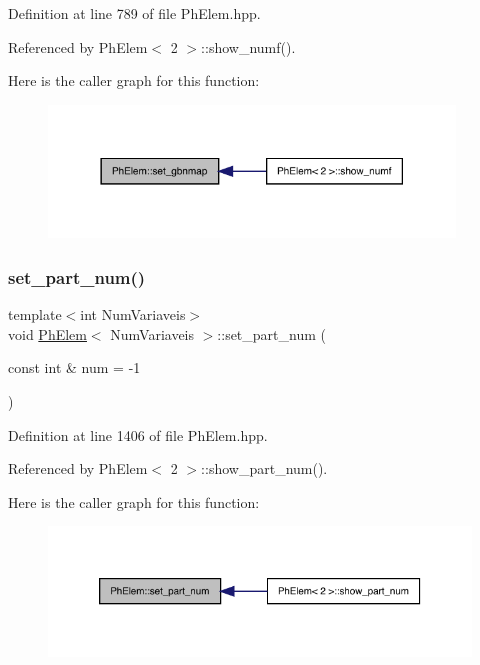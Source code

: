 Definition at line 789 of file Ph\+Elem.\+hpp.



Referenced by Ph\+Elem$<$ 2 $>$\+::show\+\_\+numf().

Here is the caller graph for this function\+:
\nopagebreak
\begin{figure}[H]
\begin{center}
\leavevmode
\includegraphics[width=306pt]{classPhElem_afba886f63bf7b67bd0a4164eae4dde5b_icgraph}
\end{center}
\end{figure}
\mbox{\label{classPhElem_a24a705e62f179fa36c6886f8f0a3ef25}} 
\subsubsection{\texorpdfstring{set\+\_\+part\+\_\+num()}{set\_part\_num()}}
{\footnotesize\ttfamily template$<$int Num\+Variaveis$>$ \\
void \hyperlink{classPhElem}{Ph\+Elem}$<$ Num\+Variaveis $>$\+::set\+\_\+part\+\_\+num (\begin{DoxyParamCaption}\item[{const int \&}]{num = {\ttfamily -\/1} }\end{DoxyParamCaption})}



Definition at line 1406 of file Ph\+Elem.\+hpp.



Referenced by Ph\+Elem$<$ 2 $>$\+::show\+\_\+part\+\_\+num().

Here is the caller graph for this function\+:
\nopagebreak
\begin{figure}[H]
\begin{center}
\leavevmode
\includegraphics[width=326pt]{classPhElem_a24a705e62f179fa36c6886f8f0a3ef25_icgraph}
\end{center}
\end{figure}
\mbox{\label{classPhElem_af2796c868709214bb9b151b47d7d471f}} 
